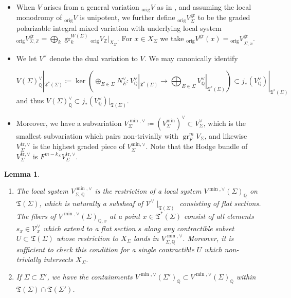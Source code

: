 \documentclass{amsart}
\newtheorem{lemma}[theorem]{Lemma}
\theoremstyle{definition}
\theoremstyle{remark}
\def\bZ{\mathbb{Z}}
\def\bQ{\mathbb{Q}}
\def\cV{\mathcal{V}}
\def\fT{\mathfrak{T}}
\def\gr{\operatorname{gr}}
\def\trans{\mathrm{tr}}
\def\orig{\mathrm{orig}}
\def\fT{\mathfrak{T}}
\numberwithin{equation}{section}
\begin{document}
\begin{itemize}
\item When $V$ arises from a general variation $_\orig V$ as in , and assuming the local monodromy of $_\orig V$ is unipotent, we further define $_\orig V_\Sigma^{\gr}$ to be the graded polarizable integral mixed variation with underlying local system $_\orig V_{\Sigma,\bZ}^{\gr}=\bigoplus_k\gr_k^{W(\Sigma)}{_\orig V_\bZ}|_{X_\Sigma}$.  For $x\in X_\Sigma$ we take ${_\orig V}^{\gr}(x)={_\orig V}_{\Sigma,x}^{\gr}$.


\item We let $V^{\vee}$ denote the dual variation to $V$. We may canonically identify

\[V(\Sigma)^\vee_\bQ|_{\fT^*(\Sigma)}\coloneqq  \ker\left(\oplus_{E\in \Sigma}N^\vee_E:V^{\vee}_\bQ|_{\fT^*(\Sigma)}\to \bigoplus_{E\in \Sigma}V^{\vee}_\bQ|_{\fT^*(\Sigma)}\right)\subset j_*(V_\bQ^\vee)|_{\fT^*(\Sigma)}\]
and thus $V(\Sigma)_\bQ^\vee\subset j_*(V_\bQ^\vee)|_{\mathfrak{T}(\Sigma)}$.

 \item Moreover, we have a subvariation $V^{\min,\vee}_\Sigma\coloneqq  (V^{\min}_\Sigma)^{\vee}\subset V^{\vee}_\Sigma $, which is the smallest subvariation which pairs non-trivially with $\gr^m_F V_\Sigma$, and likewise $V^{\trans,\vee}_\Sigma$ is the highest graded piece of $V_\Sigma^{\mathrm{min,\vee}}$.  Note that the Hodge bundle of $V_\Sigma^{\trans,\vee}$ is $F^{m-k_\Sigma}V_\Sigma^{\trans,\vee}$.



 \end{itemize}





\begin{lemma}\label{lem:compat}


\begin{enumerate}

\item  The local system $V^{\min,\vee}_{\Sigma,\bQ}$ is the restriction of a local system $V^{\min,\vee}(\Sigma)_\bQ$ on $\mathfrak{T}(\Sigma)$, which is naturally a subsheaf of $\cV^\vee\mid_{\mathfrak{T}(\Sigma)}$ consisting of flat sections. The fibers of $V^{\min,\vee}(\Sigma)_{\bQ,x}$ at a point $x\in \mathfrak{T}^*(\Sigma)$ consist of all elements $s_x\in \cV^{\vee}_x$ which extend to a flat section $s$ along any contractible subset $U\subset \mathfrak{T}(\Sigma)$ whose restriction to $X_{\Sigma}$ lands in $V^{\min,\vee}_{\Sigma,\bQ}.$ Moreover, it is sufficient to check this condition for a single contractible $U$ which non-trivially intersects $X_\Sigma$.

\item If $\Sigma \subset \Sigma'$, we have the containments
$V^{\min,\vee}(\Sigma')_\bQ\subset V^{\min,\vee}(\Sigma)_\bQ$ within $\mathfrak{T}(\Sigma)\cap \mathfrak{T}(\Sigma')$.

\end{enumerate}

\end{lemma}
\end{document}
